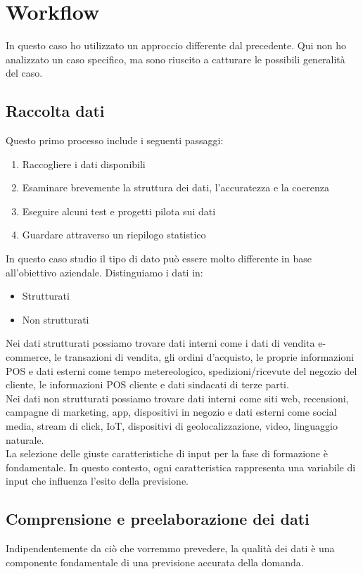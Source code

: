 \documentclass[12pt,a4paper]{report}
\begin{document}
\section{Workflow}
In questo caso ho utilizzato un approccio differente dal precedente. Qui non ho analizzato un caso specifico, ma sono riuscito a catturare le possibili generalità del caso.

\subsection{Raccolta dati}
Questo primo processo include i seguenti passaggi: \cite{mobidev:demandForecast}
\begin{enumerate}
    \item Raccogliere i dati disponibili
    \item Esaminare brevemente la struttura dei dati, l'accuratezza e la coerenza
    \item Eseguire alcuni test e progetti pilota sui dati
    \item Guardare attraverso un riepilogo statistico
\end{enumerate}

In questo caso studio il tipo di dato può essere molto differente in base all'obiettivo aziendale. Distinguiamo i dati in: \cite{mobidev:demandForecast}
\begin{itemize}
    \item Strutturati
    \item Non strutturati
\end{itemize}

Nei dati strutturati possiamo trovare dati interni come i dati di vendita e-commerce, le transazioni di vendita, gli ordini d'acquisto, le proprie informazioni POS e dati esterni come tempo metereologico, spedizioni/ricevute del negozio del cliente, le informazioni POS cliente e dati sindacati di terze parti.\\
Nei dati non strutturati possiamo trovare dati interni come siti web, recensioni, campagne di marketing, app, dispositivi in negozio e dati esterni come social media, stream di click, IoT, dispositivi di geolocalizzazione, video, linguaggio naturale.\\
La selezione delle giuste caratteristiche di input per la fase di formazione è fondamentale. In questo contesto, ogni caratteristica rappresenta una variabile di input che influenza l'esito della previsione. 

\subsection{Comprensione e preelaborazione dei dati}
Indipendentemente da ciò che vorremmo prevedere, la qualità dei dati è una componente fondamentale di una previsione accurata della domanda.
\end{document}
